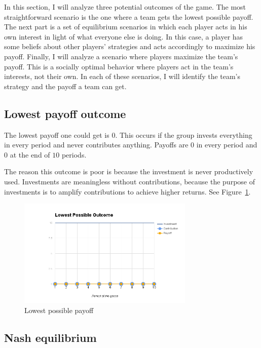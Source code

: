 	In this section, I will analyze three potential outcomes of the game. The most straightforward scenario is the one where a team gets the lowest possible payoff. The next part is a set of equilibrium scenarios in which each player acts in his own interest in light of what everyone else is doing. In this case, a player has some beliefs about other players' strategies and acts accordingly to maximize his payoff. Finally, I will analyze a scenario where players maximize the team's payoff. This is a socially optimal behavior where players act in the team's interests, not their own. In each of these scenarios, I will identify the team's strategy and the payoff a team can get.

		
	\subsection{Lowest payoff outcome}
	
		The lowest payoff one could get is $0$. This occurs if the group invests everything in every period and never contributes anything. Payoffs are $0$ in every period and $0$ at the end of $10$ periods.
	
		The reason this outcome is poor is because the investment is never productively used. Investments are meaningless without contributions, because the purpose of investments is to amplify contributions to achieve higher returns. See Figure~\ref{fig:lowest}.

		\begin{figure}
			\begin{center}
				\includegraphics[width=8.4cm]{resources/lowest.png}
				\caption{Lowest possible payoff} 
				\label{fig:lowest}
			\end{center}
		\end{figure}
		
	\subsection{Nash equilibrium}

